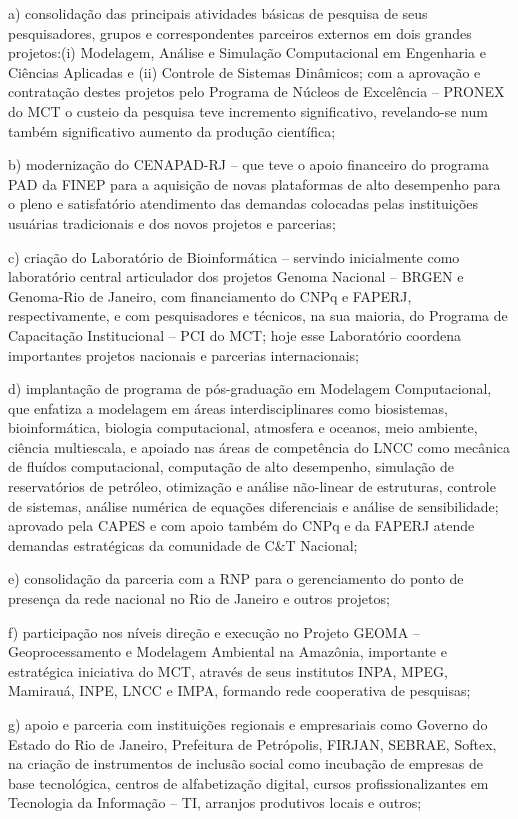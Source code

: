 \documentclass[11pt,a4paper]{article}
\begin{document}
a) consolidação das principais atividades básicas de pesquisa de seus pesquisadores, grupos e correspondentes parceiros externos em dois grandes projetos:(i) Modelagem, Análise e Simulação Computacional em Engenharia e Ciências Aplicadas e (ii) Controle de Sistemas Dinâmicos; com a aprovação e contratação destes projetos pelo Programa de Núcleos de Excelência – PRONEX do MCT o custeio da pesquisa teve incremento significativo, revelando-se num também significativo aumento da produção científica;

b) modernização do CENAPAD-RJ – que teve o apoio financeiro do programa PAD da FINEP para a aquisição de novas plataformas de alto desempenho para o pleno e satisfatório atendimento das demandas colocadas pelas instituições usuárias tradicionais e dos novos projetos e parcerias;

c) criação do Laboratório de Bioinformática – servindo inicialmente como laboratório central articulador dos projetos Genoma Nacional – BRGEN e Genoma-Rio de Janeiro, com financiamento do CNPq e FAPERJ, respectivamente, e com pesquisadores e técnicos, na sua maioria, do Programa de Capacitação Institucional – PCI do MCT; hoje esse Laboratório coordena importantes projetos nacionais e parcerias internacionais;

d) implantação de programa de pós-graduação em Modelagem Computacional, que enfatiza a modelagem em áreas interdisciplinares como biosistemas, bioinformática, biologia computacional, atmosfera e oceanos, meio ambiente, ciência multiescala, e apoiado nas áreas de competência do LNCC como mecânica de fluídos computacional, computação de alto desempenho, simulação de reservatórios de petróleo, otimização e análise não-linear de estruturas, controle de sistemas, análise numérica de equações diferenciais e análise de sensibilidade; aprovado pela CAPES e com apoio também do CNPq e da FAPERJ atende demandas estratégicas da comunidade de C$\&$T Nacional;

e) consolidação da parceria com a RNP para o gerenciamento do ponto de presença da rede nacional no Rio de Janeiro e outros projetos;

f) participação nos níveis direção e execução no Projeto GEOMA – Geoprocessamento e Modelagem Ambiental na Amazônia, importante e estratégica iniciativa do MCT, através de seus institutos INPA, MPEG, Mamirauá, INPE, LNCC e IMPA, formando rede cooperativa de pesquisas;

g) apoio e parceria com instituições regionais e empresariais como Governo do Estado do Rio de Janeiro, Prefeitura de Petrópolis, FIRJAN, SEBRAE, Softex, na criação de instrumentos de inclusão social como incubação de empresas de base tecnológica, centros de alfabetização digital, cursos profissionalizantes em Tecnologia da Informação – TI, arranjos produtivos locais e outros;
\end{document}
